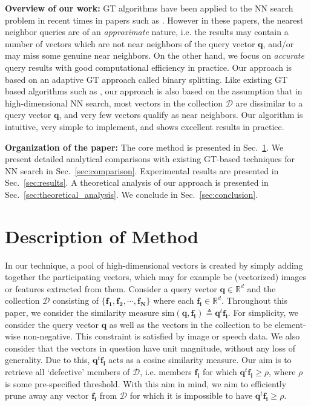 \documentclass[sigconf, anonymous, review]{acmart}
\begin{document}
\textbf{Overview of our work:} GT algorithms have been applied to the NN search problem in recent times in papers such as \cite{Shi2014, Iscen2018, Engels2021}. However in these papers, the nearest neighbor queries are of an \emph{approximate} nature, i.e. the results may contain a number of vectors which are not near neighbors of the query vector $\boldsymbol{q}$, and/or may miss some genuine near neighbors. On the other hand, we focus on \emph{accurate} query results with good computational efficiency in practice. Our approach is based on an adaptive GT approach called binary splitting. Like existing GT based algorithms such as \cite{Shi2014, Iscen2018, Engels2021}, our approach is also based on the assumption that in high-dimensional NN search, most vectors in the collection $\mathcal{D}$ are dissimilar to a query vector $\boldsymbol{q}$, and very few vectors qualify as near neighbors. Our algorithm is intuitive, very simple to implement, and shows excellent results in practice. 

\textbf{Organization of the paper:} The core method is presented in Sec.~\ref{sec:method}. We present detailed analytical comparisons with existing GT-based techniques for NN search in Sec.~\ref{sec:comparison}. Experimental results are presented in Sec.~\ref{sec:results}. A theoretical analysis of our approach is presented in Sec.~\ref{sec:theoretical_analysis}. We conclude in Sec.~\ref{sec:conclusion}.

\section{Description of Method}
\label{sec:method}
In our technique, a pool of high-dimensional vectors is created by simply adding together the participating vectors, which may for example be (vectorized) images or features extracted from them. Consider a query vector $\boldsymbol{q} \in \mathbb{R}^d$ and the collection $\mathcal{D}$ consisting of $\{\boldsymbol{f_1}, \boldsymbol{f_2},\cdots,\boldsymbol{f_N}\}$ where each $\boldsymbol{f_i} \in \mathbb{R}^d$. Throughout this paper, we consider the similarity measure $\textrm{sim}(\boldsymbol{q}, \boldsymbol{f_i}) \triangleq \boldsymbol{q}^t \boldsymbol{f_i}$. For simplicity, we consider the query vector $\boldsymbol{q}$ as well as the vectors in the collection to be element-wise non-negative. This constraint is satisfied by image or speech data. We also consider that the vectors in question have unit magnitude, without any loss of generality. Due to this, $\boldsymbol{q}^t \boldsymbol{f_i}$ acts as a cosine similarity measure. 
Our aim is to retrieve all `defective' members of $\mathcal{D}$, i.e. members $\boldsymbol{f_i}$ for which $\boldsymbol{q}^t \boldsymbol{f_i} \geq \rho$, where $\rho$ is some pre-specified threshold. With this aim in mind, we aim to efficiently prune away any vector $\boldsymbol{f_i}$ from $\mathcal{D}$ for which it is impossible to have $\boldsymbol{q}^t \boldsymbol{f_i} \geq \rho$. 
\end{document}
